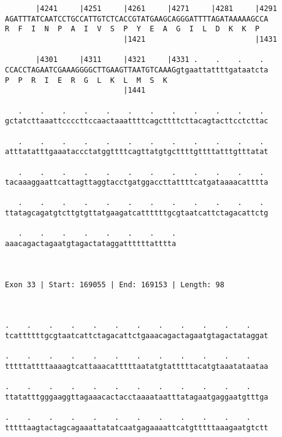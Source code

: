 \documentclass{article}
\begin{document}
\begin{Verbatim}
       |4241     |4251     |4261     |4271     |4281     |4291
AGATTTATCAATCCTGCCATTGTCTCACCGTATGAAGCAGGGATTTTAGATAAAAAGCCA
R  F  I  N  P  A  I  V  S  P  Y  E  A  G  I  L  D  K  K  P  
                           |1421                         |1431
  
       |4301     |4311     |4321     |4331 .    .    .    . 
CCACCTAGAATCGAAAGGGGCTTGAAGTTAATGTCAAAGgtgaattattttgataatcta
P  P  R  I  E  R  G  L  K  L  M  S  K                       
                           |1441                            
  
   .    .    .    .    .    .    .    .    .    .    .    . 
gctatcttaaattccccttccaactaaattttcagcttttcttacagtacttcctcttac
                                                            
   .    .    .    .    .    .    .    .    .    .    .    . 
atttatatttgaaataccctatggttttcagttatgtgcttttgttttatttgtttatat
                                                            
   .    .    .    .    .    .    .    .    .    .    .    . 
tacaaaggaattcattagttaggtacctgatggaccttattttcatgataaaacatttta
                                                            
   .    .    .    .    .    .    .    .    .    .    .    . 
ttatagcagatgtcttgtgttatgaagatcattttttgcgtaatcattctagacattctg
                                                            
   .    .    .    .    .    .    .    .
aaacagactagaatgtagactataggattttttatttta
                                       
                                       
 
Exon 33 | Start: 169055 | End: 169153 | Length: 98



.    .    .    .    .    .    .    .    .    .    .    .    
tcattttttgcgtaatcattctagacattctgaaacagactagaatgtagactataggat
                                                            
.    .    .    .    .    .    .    .    .    .    .    .    
tttttattttaaaagtcattaaacatttttaatatgtatttttacatgtaaatataataa
                                                            
.    .    .    .    .    .    .    .    .    .    .    .    
ttatatttgggaaggttagaaacactacctaaaataatttatagaatgaggaatgtttga
                                                            
.    .    .    .    .    .    .    .    .    .    .    .    
tttttaagtactagcagaaattatatcaatgagaaaattcatgtttttaaagaatgtctt
                                                            

\end{Verbatim}
\end{document}
